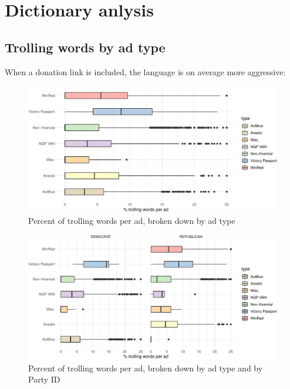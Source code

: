 \documentclass[
  12pt,
]{article}
\begin{document}
\hypertarget{dictionary-anlysis}{%
\section{Dictionary anlysis}\label{dictionary-anlysis}}

\hypertarget{trolling-words-by-ad-type}{%
\subsection{Trolling words by ad type}\label{trolling-words-by-ad-type}}

When a donation link is included, the language is on average more aggressive:

\begin{figure}
\centering
\includegraphics{figsFB/unnamed-chunk-10-1.pdf}
\caption{\label{fig:unnamed-chunk-10}Percent of trolling words per ad, broken down by ad type}
\end{figure}

\begin{figure}
\centering
\includegraphics{figsFB/unnamed-chunk-11-1.pdf}
\caption{\label{fig:unnamed-chunk-11}Percent of trolling words per ad, broken down by ad type and by Party ID}
\end{figure}
\end{document}
